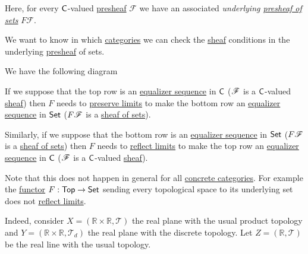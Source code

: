 \documentclass[../../../main]{subfiles}
\begin{document}
Here, for every \(\mathsf{C}\)-valued \hyperref[def:presheaf]{presheaf} \(\mathcal{F}\) we have an associated \textit{underlying \hyperref[def:presheaf]{presheaf of sets}} \(F\mathcal{F}\).

We want to know in which \hyperref[def:category]{categories} we can check the \hyperref[def:sheaf]{sheaf} conditions in the underlying \hyperref[def:presheaf]{presheaf} of sets.

We have the following diagram
\begin{center}
\end{center}
If we suppose that the top row is an \hyperref[def:equaliser]{equalizer sequence} in \(\mathsf{C}\) (\(\mathscr{F}\) is a \(\mathsf{C}\)-valued \hyperref[def:sheaf]{sheaf}) then \(F\) needs to \hyperref[def:functor-and-limits]{preserve limits} to make the bottom row an \hyperref[def:equaliser]{equalizer sequence} in \(\mathsf{Set}\) (\(F\mathscr{F}\) is a \hyperref[def:set-valued-sheaf]{sheaf of sets}).

Similarly, if we suppose that the bottom row is an \hyperref[def:equaliser]{equalizer sequence} in \(\mathsf{Set}\) (\(F\mathscr{F}\) is a \hyperref[def:set-valued-sheaf]{sheaf of sets}) then \(F\) needs to \hyperref[def:functor-and-limits]{reflect limits} to make the top row an \hyperref[def:equaliser]{equalizer sequence} in \(\mathsf{C}\) (\(\mathscr{F}\) is a \(\mathsf{C}\)-valued \hyperref[def:sheaf]{sheaf}).

Note that this does not happen in general for all \hyperref[def:concrete-category]{concrete categories}.
For example the \hyperref[def:functor]{functor} \(F: \mathsf{Top} \to \mathsf{Set}\) sending every topological space to its underlying set does not \hyperref[def:functor-and-limits]{reflect limits}.

Indeed, consider \(X = (\mathbb{R} \times \mathbb{R}, \mathcal{T})\) the real plane with the usual product topology and \(Y = (\mathbb{R} \times \mathbb{R}, \mathcal{T}_{d})\) the real plane with the discrete topology. Let \(Z = (\mathbb{R}, \mathcal{T})\) be the real line with the usual topology.
\end{document}
